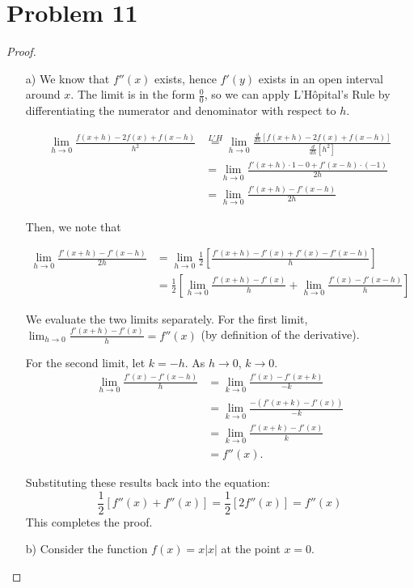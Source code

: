 \documentclass[11pt]{article}
\renewcommand{\_}[1]{\underline{ #1 }}
\theoremstyle{definition}
\numberwithin{equation}{subsection}
\begin{document}
\section*{Problem 11}
\begin{proof}
\begin{enumerate}
    \item[a)] We know that $f''(x)$ exists, hence $f'(y)$ exists in an open interval around $x$. The limit is in the form $\frac{0}{0}$, so we can apply L'Hôpital's Rule by differentiating the numerator and denominator with respect to $h$.

\begin{align*}
\lim_{h \to 0} \frac{f(x + h) - 2f(x) + f(x - h)}{h^2}
&\stackrel{L'H}{=} \lim_{h \to 0} \frac{\frac{d}{dh}[f(x + h) - 2f(x) + f(x - h)]}{\frac{d}{dh}[h^2]} \\
&= \lim_{h \to 0} \frac{f'(x+h) \cdot 1 - 0 + f'(x-h) \cdot (-1)}{2h} \\
&= \lim_{h \to 0} \frac{f'(x+h) - f'(x-h)}{2h}
\end{align*}

Then, we note that

\begin{align*}
\lim_{h \to 0} \frac{f'(x+h) - f'(x-h)}{2h}
&= \lim_{h \to 0} \frac{1}{2} \left[ \frac{f'(x+h) - f'(x) + f'(x) - f'(x-h)}{h} \right] \\
&= \frac{1}{2} \left[ \lim_{h \to 0} \frac{f'(x+h) - f'(x)}{h} + \lim_{h \to 0} \frac{f'(x) - f'(x-h)}{h} \right]
\end{align*}

We evaluate the two limits separately. For the first limit, $\displaystyle \lim_{h \to 0} \frac{f'(x+h) - f'(x)}{h} = f''(x)$ (by definition of the derivative).

For the second limit, let $k = -h$. As $h \to 0$, $k \to 0$.
    \begin{align*}
        \lim_{h \to 0} \frac{f'(x) - f'(x-h)}{h} &= \lim_{k \to 0} \frac{f'(x) - f'(x+k)}{-k}\\ &= \lim_{k \to 0} \frac{-(f'(x+k) - f'(x))}{-k} \\&= \lim_{k \to 0} \frac{f'(x+k) - f'(x)}{k} \\&= f''(x).
    \end{align*}

Substituting these results back into the equation:
$$ \frac{1}{2} [f''(x) + f''(x)] = \frac{1}{2} [2f''(x)] = f''(x) $$
This completes the proof.

\item[b)]Consider the function $f(x) = x|x|$ at the point $x=0$.


\end{enumerate}
\end{proof}
\end{document}
